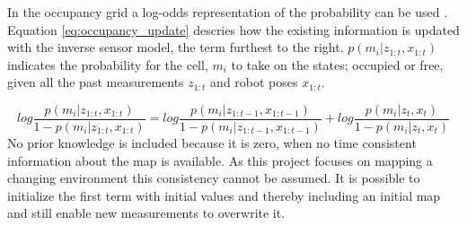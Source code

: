 In the occupancy grid a log-odds representation of the probability can be used \cite{probRob}. 
Equation \ref{eq:occupancy_update} descries how the existing information is updated with the inverse sensor model, the term furthest to the right. $p(m_i|z_{1:t},x_{1:t})$ indicates the probability for the cell, $m_i$ to take on the states; occupied or free, given all the past measurements $z_{1:t}$ and robot poses $x_{1:t}$. 

\begin{equation}
	log \frac{p(m_i|z_{1:t},x_{1:t})}{1-p(m_i|z_{1:t},x_{1:t})} = log \frac{p(m_i|z_{1:t-1},x_{1:t-1})}{1-p(m_i|z_{1:t-1},x_{1:t-1})} + log \frac{ p(m_i | z_t,x_t) }{ 1 - p(m_i | z_t,x_t) }
	\label{eq:occupancy_update}
\end{equation}
No prior knowledge is included because it is zero, when no time consistent information about the map is available.
As this project focuses on mapping a changing environment this consistency cannot be assumed.
It is possible to initialize the first term with initial values and thereby including an initial map and still enable new measurements to overwrite it.